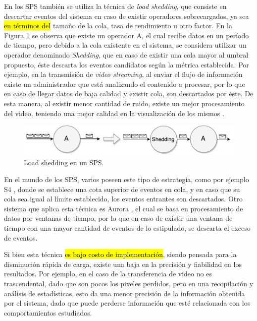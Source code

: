 En los SPS también se utiliza la técnica de \textit{load shedding}, que consiste en descartar eventos del sistema en caso de existir operadores sobrecargados, ya sea \hl{en términos del} tamaño de la cola, tasa de rendimiento u otro factor. En la Figura \ref{fig:loadShedding} se observa que existe un operador A, el cual recibe datos en un período de tiempo, pero debido a la cola existente en el sistema, se considera utilizar un operador denominado \textit{Shedding}, que en caso de existir una cola mayor al umbral propuesto, éste descarta los eventos candidatos según la métrica establecida. Por ejemplo, en la transmisión de \textit{video streaming}, al enviar el flujo de información existe un administrador que está analizando el contenido a procesar, por lo que en caso de llegar datos de baja calidad y existir cola, son descartados por éste. De esta manera, al existir menor cantidad de ruido, existe un mejor procesamiento del video, teniendo una mejor calidad en la visualización de los mismos \citep{SheuC09}. 

\begin{figure}[!ht]
	\centering
	\includegraphics[scale=0.6]{images/LoadShedding.pdf}
	\caption{Load shedding en un SPS.}
	\label{fig:loadShedding}
\end{figure}

En el mundo de los SPS, varios poseen este tipo de estrategia, como por ejemplo S4 \citep{s4}, donde se establece una cota superior de eventos en cola, y en caso que su cola sea igual al límite establecido, los eventos entrantes son descartados. Otro sistema que aplica esta técnica es Aurora \citep{aurora}, el cual se basa en procesamiento de datos por ventanas de tiempo, por lo que en caso de existir una ventana de tiempo con una mayor cantidad de eventos de lo estipulado, se descarta el exceso de eventos.

Si bien esta técnica \hl{es bajo costo de implementación}, siendo pensada para la disminución rápida de carga, existe una baja en la precisión y fiabilidad en los resultados. Por ejemplo, en el caso de la transferencia de video no es trascendental, dado que son pocos los pixeles perdidos, pero en una recopilación y análisis de estadísticas, esto da una menor precisión de la información obtenida por el sistema, dado que puede perderse información que esté relacionada con los comportamientos estudiados.

